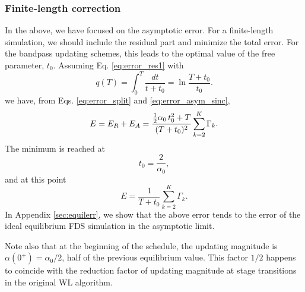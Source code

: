\documentclass[reprint, floatfix]{revtex4-1}
\begin{document}
\subsubsection{\label{sec:finlencorr}
Finite-length correction}



In the above, we have focused on
the asymptotic error.
%
For a finite-length simulation,
we should include the residual part
and minimize the total error.
%
For the bandpass updating schemes,
this leads to the optimal value
of the free parameter, $t_0$.
%
Assuming Eq. \eqref{eq:error_res1} with
$$
q(T)
=
\int_0^T \frac{ dt } { t + t_0 }
=
\ln \frac{ T + t_0 } { t_0 }.
$$
%
we have, from Eqs. \eqref{eq:error_split}
and \eqref{eq:error_asym_sinc},
%
\begin{equation}
  E
  =
  E_R + E_A
  =
  \frac { \frac 1 2 \alpha_0 \, t_0^2 + T }
        {          ( T + t_0 )^2          }
  \sum_{ k = 2 }^K \Gamma_k
  .
\notag
\end{equation}
%
The minimum is reached at
%
\begin{equation}
  t_0
  =
  \frac{     2    }
       { \alpha_0 }
  ,
\label{eq:t0_sinc}
\end{equation}
%
and at this point
%
\begin{equation}
  E
  =
  \frac{   1     }
       { T + t_0 }
  \sum_{ k = 2 }^K
    \Gamma_k
  .
\label{eq:error_sinc}
\end{equation}
%
In Appendix \ref{sec:equilerr},
we show that the above error tends
to the error of the ideal equilibrium FDS simulation
in the asymptotic limit.

Note also that at the beginning of the schedule,
the updating magnitude is
$\alpha(0^+) = \alpha_0 / 2$,
half of the previous equilibrium value.
%
This factor $1/2$
happens to coincide with the
reduction factor of updating magnitude
at stage transitions
in the original WL algorithm\cite{
wang2001, wang2001pre}.




%
%
\end{document}
